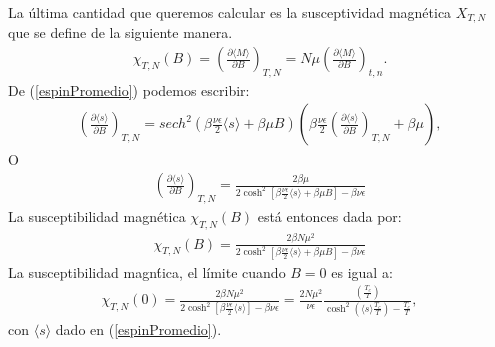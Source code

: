 \documentclass[letterpaper,12pt,oneside]{book}
\begin{document}
%
La \'ultima cantidad que queremos calcular es la susceptividad magn\'etica $X_{T,N}$ que se define de la siguiente manera.
%
\begin{eqnarray}
\chi_{T,N} (B) = \left(\frac{\partial \langle M \rangle}{\partial B} \right)_{T,N} = N\mu \left(\frac{\partial \langle M \rangle}{\partial B} \right)_{t,n}.
\end{eqnarray}
%
De (\ref{espinPromedio}) podemos escribir:
%
\begin{eqnarray}
\left(\frac{\partial \langle s \rangle}{\partial B}\right)_{T,N} = sech^2 \left(\beta \frac{\nu \epsilon}{2}\langle s \rangle + \beta \mu B\right)\left(\beta \frac{\nu \epsilon}{2}\left(\frac{\partial \langle s \rangle}{\partial B} \right)_{T,N} + \beta \mu \right), 
\end{eqnarray}
%
O
%
\begin{eqnarray}
\left(\frac{\partial\langle s \rangle}{\partial B}\right)_{T,N} = \frac{2\beta \mu}{2\cosh^2 \left[\beta  \frac{\nu \epsilon}{2}\langle s \rangle + \beta \mu B\right] - \beta \nu \epsilon}
\end{eqnarray}
%
La susceptibilidad magn\'etica $\chi_{T,N}(B)$ est\'a entonces dada por:
%
\begin{eqnarray}
\chi_{T,N}(B) = \frac{2\beta N \mu^2}{2 \cosh^2 \left[\beta \frac{\nu \epsilon}{2} \langle s \rangle + \beta \mu B\right]-\beta \nu \epsilon} 
\end{eqnarray}
%
La susceptibilidad magn\'tica, el l\'imite cuando $B=0$ es igual a:
%
\begin{eqnarray}
\chi_{T,N}(0) =\frac{2\beta N \mu^2}{2 \cosh^2 \left[\beta \frac{\nu \epsilon}{2} \langle s \rangle \right]-\beta \nu \epsilon} = \frac{2 N \mu^2}{\nu \epsilon}\frac{\left(\frac{T_c}{T}\right)}{\cosh^2\left(\langle s \rangle \frac{T_c}{T} \right) - \frac{T_c}{T}},
\end{eqnarray}
%
con $\langle s \rangle$ dado en (\ref{espinPromedio}).
\end{document}
